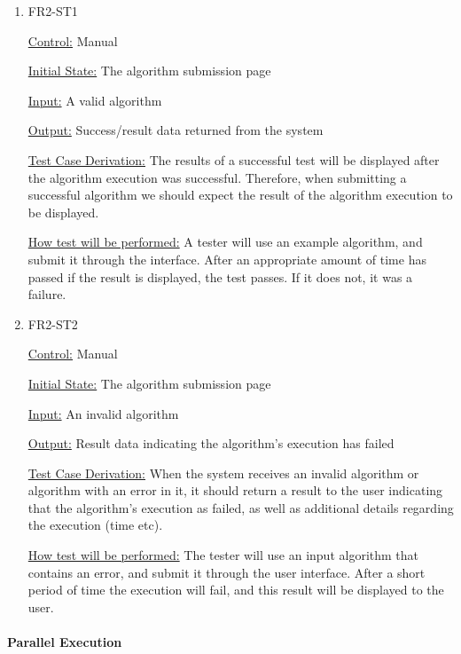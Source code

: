 \documentclass[12pt, titlepage]{article}
\begin{document}
\begin{enumerate}

\item{FR2-ST1\\}

\underline{Control:} Manual

\underline{Initial State:} The algorithm submission page

\underline{Input:} A valid algorithm 

\underline{Output:} Success/result data returned from the system

\underline{Test Case Derivation:} The results of a successful test will be displayed after the algorithm execution was successful. Therefore, when submitting a successful algorithm we should expect the result of the algorithm execution to be displayed. 

\underline{How test will be performed:} A tester will use an example algorithm, and submit it through the interface. After an appropriate amount of time has passed if the result is displayed, the test passes. If it does not, it was a failure.
					
\item{FR2-ST2\\}

\underline{Control:} Manual

\underline{Initial State:} The algorithm submission page

\underline{Input:} An invalid algorithm

\underline{Output:} Result data indicating the algorithm’s execution has failed

\underline{Test Case Derivation:} When the system receives an invalid algorithm or algorithm with an error in it, it should return a result to the user indicating that the algorithm’s execution as failed, as well as additional details regarding the execution (time etc). 

\underline{How test will be performed:} The tester will use an input algorithm that contains an error, and submit it through the user interface. After a short period of time the execution will fail, and this result will be displayed to the user. 

\end{enumerate}

\paragraph{Parallel Execution}
\end{document}
